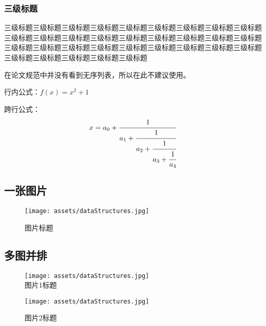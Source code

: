 \documentclass{resume/dhuBachelorclass}
\begin{document}
\subsubsection{三级标题}
三级标题三级标题三级标题三级标题三级标题三级标题三级标题三级标题三级标题三级标题三级标题三级标题三级标题三级标题三级标题三级标题三级标题三级标题三级标题三级标题三级标题三级标题三级标题三级标题三级标题三级标题三级标题三级标题三级标题三级标题三级标题三级标题


在论文规范中并没有看到无序列表，所以在此不建议使用。



行内公式：$\displaystyle f(x) = x^2 + 1$

跨行公式： %
\begin{equation}
    x = a_0 + \cfrac{1}{a_1 
            + \cfrac{1}{a_2 
            + \cfrac{1}{a_3 + \cfrac{1}{a_4} } } }
\end{equation}

\subsection{一张图片}

\begin{figure}[H] %
    \centering %
    \texttt{[image: assets/dataStructures.jpg]}
    \caption{图片标题} %
    \label{fig: 数据结构2} %
\end{figure}

\subsection{多图并排}

\begin{figure}[H]
    \centering
    \begin{minipage}[c]{0.40\textwidth} %
    \centering
    \texttt{[image: assets/dataStructures.jpg]}\\
    \caption{图片1标题}
    \end{minipage}
    \hspace{1em}
    \begin{minipage}[c]{0.40\textwidth} %
    \centering
    \texttt{[image: assets/dataStructures.jpg]}\\
    \caption{图片2标题}
    \end{minipage}
\end{figure}
\end{document}

